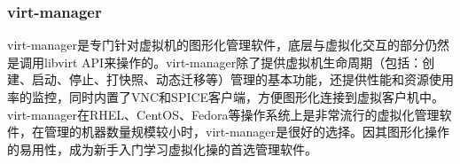 \subsubsection{virt-manager}
virt-manager是专门针对虚拟机的图形化管理软件，底层与虚拟化交互的部分仍然是调用libvirt API来操作的。virt-manager除了提供虚拟机生命周期（包括：创建、启动、停止、打快照、动态迁移等）管理的基本功能，还提供性能和资源使用率的监控，同时内置了VNC和SPICE客户端，方便图形化连接到虚拟客户机中。virt-manager在RHEL、CentOS、Fedora等操作系统上是非常流行的虚拟化管理软件，在管理的机器数量规模较小时，virt-manager是很好的选择。因其图形化操作的易用性，成为新手入门学习虚拟化操的首选管理软件。












